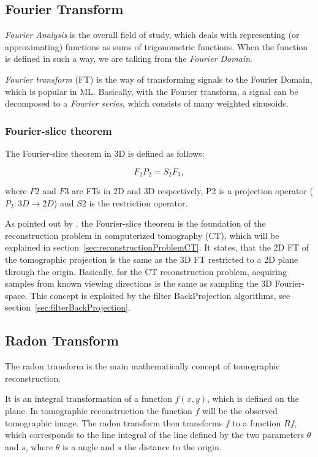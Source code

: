 \subsection{Fourier Transform}
\textit{Fourier Analysis} is the overall field of study, which deals with representing (or approximating) functions as 
sums of trigonometric functions. When the function is defined in such a way, we are talking from the \textit{Fourier Domain}.

\textit{Fourier transform} (FT) is the way of transforming signals to the Fourier Domain, which is popular in ML.
Basically, with the Fourier transform, a signal can be decomposed to a \textit{Fourier series}, which consists of many weighted sinusoids. 

\subsubsection{Fourier-slice theorem}
The Fourier-slice theorem \cite{fourierSliceTheorem} in 3D is defined as follows:

\begin{equation}
    \label{eq:Fourrier-slice}
    F_2 P_2 = S_2 F_3,
\end{equation}

where $F2$ and $F3$ are FTs in 2D and 3D respectively, P2 is a projection operator ($P_2 : 3D \rightarrow 2D$) and $S2$ is the restriction operator.

As pointed out by \cite{cryoEmMath},
the Fourier-slice theorem is the foundation of the reconstruction problem in computerized tomography (CT), which will be explained in section~\ref{sec:reconstructionProblemCT}.
It states, that the 2D FT of the tomographic projection is the same as the 3D FT restricted to a 2D plane through the origin.
Basically, for the CT reconstruction problem, acquiring samples from known viewing directions is the same 
as sampling the 3D Fourier-space. This concept is exploited by the filter BackProjection algorithms, see section~\ref{sec:filterBackProjection}.

\subsection{Radon Transform}
The radon transform\cite{radonTransform} is the main mathematically concept of tomographic reconstruction.

It is an integral transformation of a function $f(x,y)$, which is defined on the plane. In tomographic reconstruction
the function $f$ will be the observed tomographic image.
The radon transform then transforms $f$ to a function $Rf$, which corresponds to the line integral of the line defined by 
the two parameters $\theta$ and $s$, where $\theta$ is a angle and $s$ the distance to the origin.

